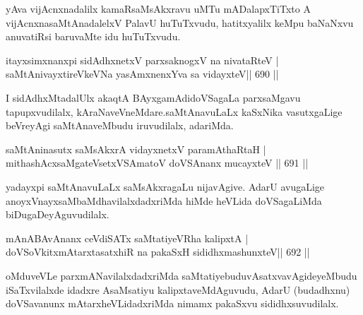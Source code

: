\begin{artha}
yAva vijAcnxnadalilx kamaRsaMsAkxravu uMTu mADalapxTiTxto A vijAcnxnasaMtAnadalelxV PalavU huTuTxvudu, hatitxyalilx keMpu baNaNxvu anuvatiRsi baruvaMte idu huTuTxvudu.
\end{artha}


\begin{shl}
itayxsimxnanxpi sidAdhxnetxV parxsaknogxV na nivataRteV | \\
saMtAnivayxtireVkeVNa yasAmxnenxYva sa vidayxteV\hfill ||  690 ||  
\end{shl}

\begin{artha}
I sidAdhxMtadalUlx akaqtA BAyxgamAdidoVSagaLa parxsaMgavu tapupxvudilalx, kAraNaveVneMdare.saMtAnavuLaLx kaSxNika vasutxgaLige beVreyAgi saMtAnaveMbudu iruvudilalx, adariMda.
\end{artha}

\begin{shl}
saMtAninasutx saMsAkxrA vidayxnetxV paramAthaRtaH | \\
mithashAcxsaMgateVsetxVSAmatoV doVSAnanx mucayxteV \hfill||  691 ||  
\end{shl}

\begin{artha}
yadayxpi saMtAnavuLaLx saMsAkxragaLu nijavAgive. AdarU avugaLige anoyxVnayxsaMbaMdhavilalxdadxriMda hiMde heVLida doVSagaLiMda biDugaDeyAguvudilalx.
\end{artha}

\begin{shl}
mAnABAvAnanx ceVdiSATx \footnotemark[1]saMtatiyeVRha kalipxtA | \\
doVSoVkitxmAtarxtasatxhiR na pakaSxH sididhxmashunxteV\hfill ||  692 ||  
\end{shl}

\begin{artha}
oMduveVLe parxmANavilalxdadxriMda saMtatiyebuduvAsatxvavAgideyeMbudu iSaTxvilalxde idadxre AsaMsatiyu kalipxtaveMdAguvudu, AdarU (budadhxnu) doVSavanunx mAtarxheVLidadxriMda nimamx pakaSxvu sididhxsuvudilalx.
\end{artha}

